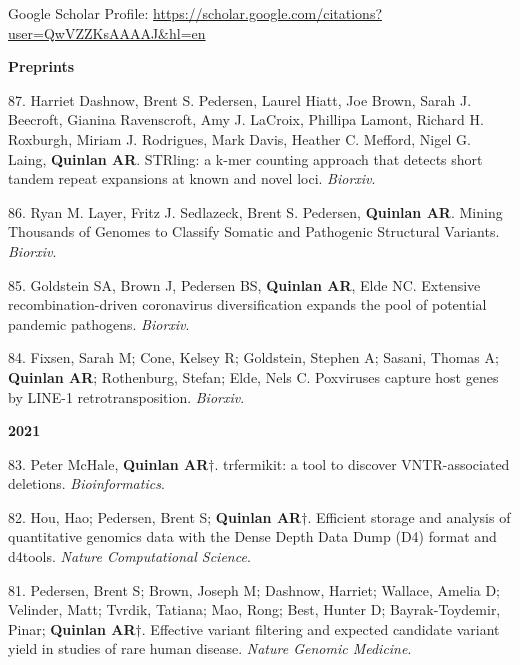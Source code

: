 \documentclass[margin,line]{cv}
\begin{document}
\begin{resume}
    Google Scholar Profile: \url{https://scholar.google.com/citations?user=QwVZZKsAAAAJ&hl=en}

    \textbf{Preprints} \\

    \begin{list}{*}{}

    \item[87.] Harriet Dashnow, Brent S. Pedersen, Laurel Hiatt, Joe Brown, Sarah J. Beecroft, Gianina Ravenscroft, Amy J. LaCroix, Phillipa Lamont, Richard H. Roxburgh, Miriam J. Rodrigues, Mark Davis, Heather C. Mefford, Nigel G. Laing, \textbf{Quinlan AR}. 
    STRling: a k-mer counting approach that detects short tandem repeat expansions at known and novel loci. \emph{Biorxiv}. 

    \item[86.] Ryan M. Layer, Fritz J. Sedlazeck, Brent S. Pedersen, \textbf{Quinlan AR}. Mining Thousands of Genomes to Classify Somatic and Pathogenic Structural Variants. \emph{Biorxiv}. 

    \item[85.] Goldstein SA, Brown J, Pedersen BS, \textbf{Quinlan AR}, Elde NC. Extensive recombination-driven coronavirus diversification expands the pool of potential pandemic pathogens. \emph{Biorxiv}. 

    \item[84.] Fixsen, Sarah M; Cone, Kelsey R; Goldstein, Stephen A; Sasani, Thomas A; \textbf{Quinlan AR}; Rothenburg, Stefan; Elde, Nels C. Poxviruses capture host genes by LINE-1 retrotransposition. \emph{Biorxiv}. 



    \end{list}    

    \textbf{2021} \\

    \begin{list}{*}{}

    \item[83.] Peter McHale, \textbf{Quinlan AR}$\dagger$. trfermikit: a tool to discover VNTR-associated deletions. \emph{Bioinformatics}. 

    \item[82.] Hou, Hao; Pedersen, Brent S; \textbf{Quinlan AR}$\dagger$.  Efficient storage and analysis of quantitative genomics data with the Dense Depth Data Dump (D4) format and d4tools. \emph{Nature Computational Science}. 

    \item[81.] Pedersen, Brent S; Brown, Joseph M; Dashnow, Harriet; Wallace, Amelia D; Velinder, Matt; Tvrdik, Tatiana; Mao, Rong; Best, Hunter D; Bayrak-Toydemir, Pinar; \textbf{Quinlan AR}$\dagger$.  Effective variant filtering and expected candidate variant yield in studies of rare human disease. \emph{Nature Genomic Medicine}. 


\end{list}
\end{resume}
\end{document}
